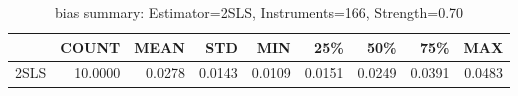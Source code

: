 \begin{table}[ht]
\centering
\caption{bias summary: Estimator=2SLS, Instruments=166, Strength=0.70}
\begin{tabular}{lrrrrrrrr}
\toprule
 & COUNT & MEAN & STD & MIN & 25\% & 50\% & 75\% & MAX \\
\midrule
2SLS & 10.0000 & 0.0278 & 0.0143 & 0.0109 & 0.0151 & 0.0249 & 0.0391 & 0.0483 \\
\bottomrule
\end{tabular}
\end{table}
